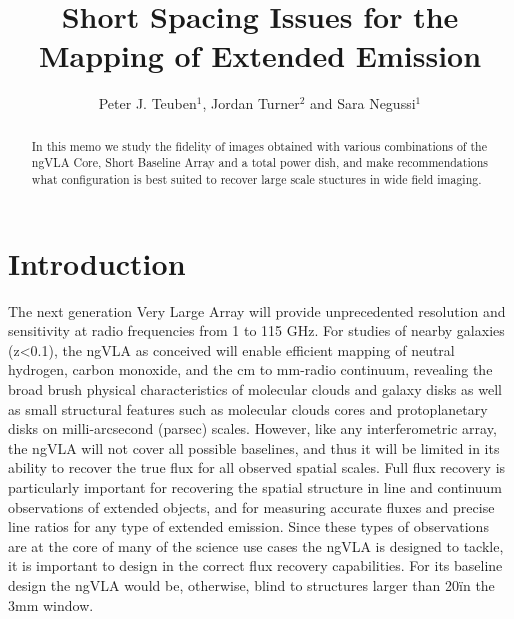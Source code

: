 \documentclass[11pt,twoside]{article}
\begin{document}
\title{Short Spacing Issues for the Mapping of Extended Emission}
\author{Peter J. Teuben$^1$, Jordan Turner$^2$ and Sara Negussi$^1$
}


\begin{abstract}

In this memo we study the fidelity of images obtained with various
combinations of the ngVLA Core, Short Baseline Array and a total power
dish, and make recommendations what configuration is best suited to
recover large scale stuctures in wide field imaging.




\end{abstract}

\section{Introduction}

The next generation Very Large Array will provide unprecedented
resolution and sensitivity at radio frequencies from 1 to 115 GHz.
For studies of nearby galaxies (z<0.1), the ngVLA as conceived will
enable efficient mapping of neutral hydrogen, carbon monoxide, and the
cm to mm-radio continuum, revealing the broad brush physical
characteristics of molecular clouds and galaxy disks as well as small
structural features such as molecular clouds cores and protoplanetary
disks on milli-arcsecond (parsec) scales.  However, like any
interferometric array, the ngVLA will not cover all possible
baselines, and thus it will be limited in its ability to recover the
true flux for all observed spatial scales.  Full flux recovery is
particularly important for recovering the spatial structure in line
and continuum observations of extended objects, and for measuring
accurate fluxes and precise line ratios for any type of extended
emission. Since these types of observations are at the core of many of
the science use cases the ngVLA is designed to tackle, it is important
to design in the correct flux recovery capabilities. For its baseline
design the ngVLA would be, otherwise, blind to structures larger than
20\" in the 3mm window.
\end{document}
